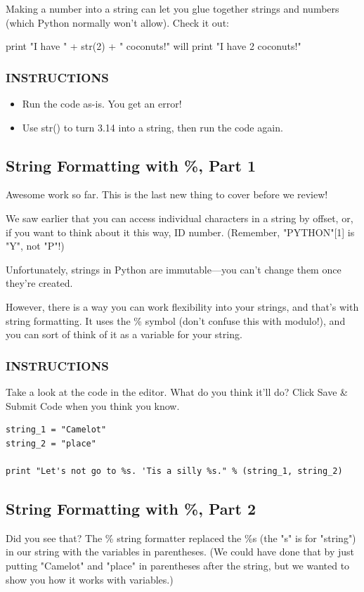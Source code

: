 \documentclass[12pt,a4paper,final,twoside,onecolumn,titlepage]{book}
\begin{document}
Making a number into a string can let you glue together strings and numbers (which Python normally won't allow). Check it out:

print "I have " + str(2) + " coconuts!"
will print "I have 2 coconuts!"

\subsubsection{INSTRUCTIONS}
\begin{itemize}
\item Run the code as-is. You get an error!
\item Use str() to turn 3.14 into a string, then run the code again.
\end{itemize}

\subsection{String Formatting with \%, Part 1}
Awesome work so far. This is the last new thing to cover before we review!

We saw earlier that you can access individual characters in a string by offset, or, if you want to think about it this way, ID number. (Remember, "PYTHON"[1] is "Y", not "P"!)

Unfortunately, strings in Python are immutable—you can't change them once they're created.

However, there is a way you can work flexibility into your strings, and that's with string formatting. It uses the \% symbol (don't confuse this with modulo!), and you can sort of think of it as a variable for your string.

\subsubsection{INSTRUCTIONS}
Take a look at the code in the editor. What do you think it'll do? Click Save \& Submit Code when you think you know.

\begin{lstlisting}
string_1 = "Camelot"
string_2 = "place"

print "Let's not go to %s. 'Tis a silly %s." % (string_1, string_2)
\end{lstlisting}

\subsection{String Formatting with \%, Part 2}
Did you see that? The \% string formatter replaced the \%s (the "s" is for "string") in our string with the variables in parentheses. (We could have done that by just putting "Camelot" and "place" in parentheses after the string, but we wanted to show you how it works with variables.)
\end{document}

